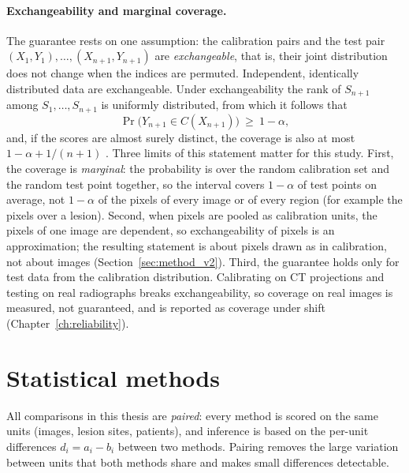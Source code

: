 \paragraph{Exchangeability and marginal coverage.} The guarantee rests on one assumption: the calibration pairs and the test pair
$(X_1,Y_1),\dots,(X_{n+1},Y_{n+1})$ are \emph{exchangeable}, that is, their joint distribution does not change when the indices are permuted.
Independent, identically distributed data are exchangeable. Under exchangeability the rank of $S_{n+1}$ among $S_1,\dots,S_{n+1}$ is uniformly
distributed, from which it follows that
\begin{equation}
\Pr\big(Y_{n+1}\in C(X_{n+1})\big)\ \ge\ 1-\alpha ,
\label{eq:bg_coverage}
\end{equation}
and, if the scores are almost surely distinct, the coverage is also at most $1-\alpha+1/(n+1)$ \citep{lei2018conformal}. Three limits of this
statement matter for this study. First, the coverage is \emph{marginal}: the probability is over the random calibration set and the random test
point together, so the interval covers $1-\alpha$ of test points on average, not $1-\alpha$ of the pixels of every image or of every region (for
example the pixels over a lesion). Second, when pixels are pooled as calibration units, the pixels of one image are dependent, so exchangeability
of pixels is an approximation; the resulting statement is about pixels drawn as in calibration, not about images (Section~\ref{sec:method_v2}).
Third, the guarantee holds only for test data from the calibration distribution. Calibrating on CT projections and testing on real radiographs
breaks exchangeability, so coverage on real images is measured, not guaranteed, and is reported as coverage under shift
(Chapter~\ref{ch:reliability}).

\section{Statistical methods}
\label{sec:bg_stats}
All comparisons in this thesis are \emph{paired}: every method is scored on the same units (images, lesion sites, patients), and inference is
based on the per-unit differences $d_i=a_i-b_i$ between two methods. Pairing removes the large variation between units that both methods share and
makes small differences detectable.

